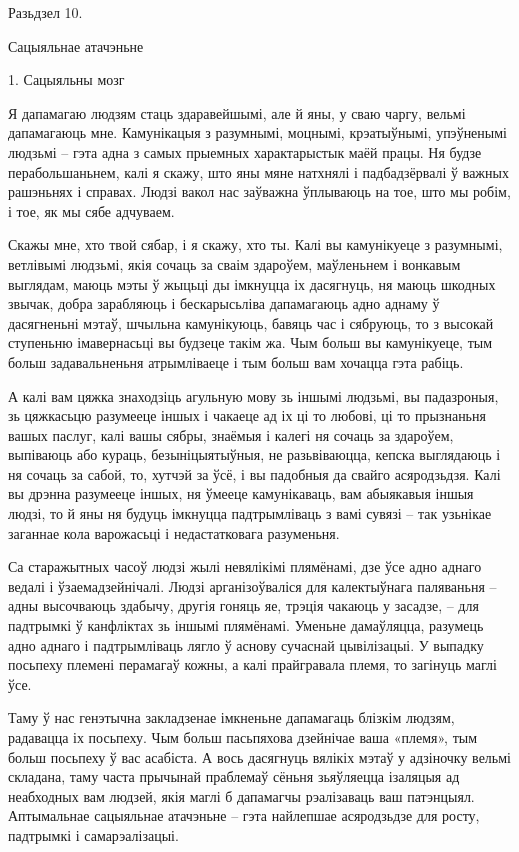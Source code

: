 Разьдзел 10. 

Сацыяльнае атачэньне

1. Сацыяльны мозг

Я дапамагаю людзям стаць здаравейшымі, але й яны, у сваю чаргу, вельмі дапамагаюць мне. Камунікацыя з разумнымі, моцнымі, крэатыўнымі, упэўненымі людзьмі – гэта адна з самых прыемных характарыстык маёй працы. Ня будзе перабольшаньнем, калі я скажу, што яны мяне натхнялі і падбадзёрвалі ў важных рашэньнях і справах. Людзі вакол нас заўважна ўплываюць на тое, што мы робім, і тое, як мы сябе адчуваем.

Скажы мне, хто твой сябар, і я скажу, хто ты. Калі вы камунікуеце з разумнымі, ветлівымі людзьмі, якія сочаць за сваім здароўем, маўленьнем і вонкавым выглядам, маюць мэты ў жыцьці ды імкнуцца іх дасягнуць, ня маюць шкодных звычак, добра зарабляюць і бескарысьліва дапамагаюць адно аднаму ў дасягненьні мэтаў, шчыльна камунікуюць, бавяць час і сябруюць, то з высокай ступеньню імавернасьці вы будзеце такім жа. Чым больш вы камунікуеце, тым больш задавальненьня атрымліваеце і тым больш вам хочацца гэта рабіць.

А калі вам цяжка знаходзіць агульную мову зь іншымі людзьмі, вы падазроныя, зь цяжкасьцю разумееце іншых і чакаеце ад іх ці то любові, ці то прызнаньня вашых паслуг, калі вашы сябры, знаёмыя і калегі ня сочаць за здароўем, выпіваюць або кураць, безыніцыятыўныя, не разьвіваюцца, кепска выглядаюць і ня сочаць за сабой, то, хутчэй за ўсё, і вы падобныя да свайго асяродзьдзя. Калі вы дрэнна разумееце іншых, ня ўмееце камунікаваць, вам абыякавыя іншыя людзі, то й яны ня будуць імкнуцца падтрымліваць з вамі сувязі – так узьнікае заганнае кола варожасьці і недастатковага разуменьня.

Са старажытных часоў людзі жылі невялікімі плямёнамі, дзе ўсе адно аднаго ведалі і ўзаемадзейнічалі. Людзі арганізоўваліся для калектыўнага паляваньня – адны высочваюць здабычу, другія гоняць яе, трэція чакаюць у засадзе, – для падтрымкі ў канфліктах зь іншымі плямёнамі. Уменьне дамаўляцца, разумець адно аднаго і падтрымліваць лягло ў аснову сучаснай цывілізацыі. У выпадку посьпеху племені перамагаў кожны, а калі прайгравала племя, то загінуць маглі ўсе.

Таму ў нас генэтычна закладзенае імкненьне дапамагаць блізкім людзям, радавацца іх посьпеху. Чым больш пасьпяхова дзейнічае ваша «племя», тым больш посьпеху ў вас асабіста. А вось дасягнуць вялікіх мэтаў у адзіночку вельмі складана, таму часта прычынай праблемаў сёньня зьяўляецца ізаляцыя ад неабходных вам людзей, якія маглі б дапамагчы рэалізаваць ваш патэнцыял. Аптымальнае сацыяльнае атачэньне – гэта найлепшае асяродзьдзе для росту, падтрымкі і самарэалізацыі.


